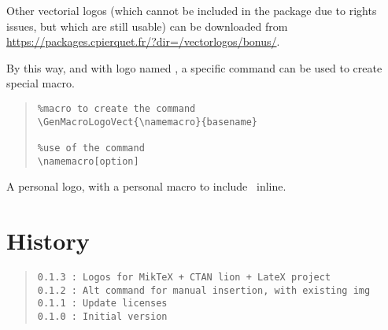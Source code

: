\documentclass[11pt,a4paper]{ltxdoc}
\begin{document}
Other vectorial logos (which cannot be included in the package due to rights issues, but which are still usable) can be downloaded from \url{https://packages.cpierquet.fr/?dir=/vectorlogos/bonus/}.

\smallskip

By this way, and with logo named , a specific command can be used to create special macro.

\begin{quote}
\begin{verbatim}
%macro to create the command
\GenMacroLogoVect{\namemacro}{basename}

%use of the command
\namemacro[option]
\end{verbatim}
\end{quote}

\begin{tcblisting}{}
{\LARGE A personal logo, with a personal macro to include \logoxcas\ inline.}
\end{tcblisting}

\pagebreak

\section{History}

\begin{quote}
\begin{verbatim}
0.1.3 : Logos for MikTeX + CTAN lion + LateX project
0.1.2 : Alt command for manual insertion, with existing img
0.1.1 : Update licenses
0.1.0 : Initial version
\end{verbatim}
\end{quote}
\end{document}
